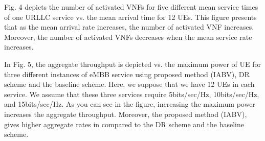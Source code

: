 \documentclass[lettersize,journal]{IEEEtran}
\begin{document}
Fig. 4 depicts the number of activated VNFs for five different mean service times of one URLLC service vs. the mean arrival time for 12 UEs. This figure presents that as the mean arrival rate increases, the number of activated VNF increases. Moreover, the number of activated VNFs decreases when the mean service rate increases.


In Fig. 5, the aggregate throughput is depicted vs. the maximum power of UE for three different instances of eMBB service using proposed method (IABV), DR scheme and the baseline scheme. Here, we suppose that we have 12 UEs in each service.  We assume that these three services require 5bits/sec/Hz, 10bits/sec/Hz, and 15bits/sec/Hz.
As you can see in the figure, increasing the maximum power increases the aggregate throughput. Moreover, the proposed method (IABV), gives higher aggregate rates in compared to the DR scheme and the baseline scheme.
\end{document}

